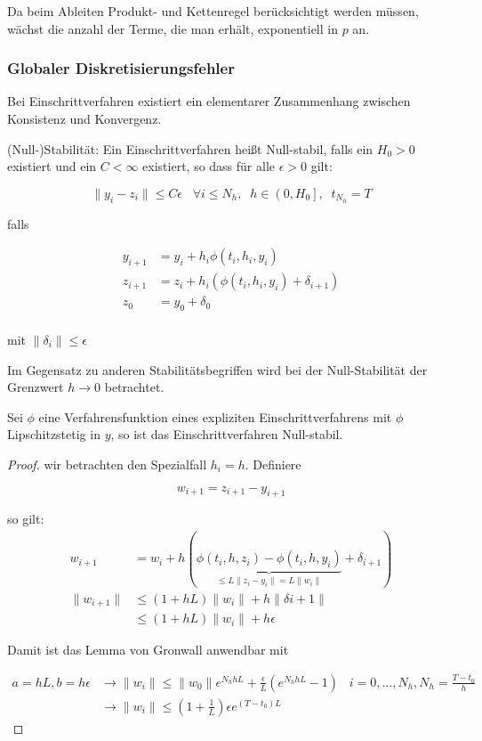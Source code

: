 Da beim Ableiten Produkt- und Kettenregel berücksichtigt werden müssen, wächst die anzahl der Terme, die man erhält, exponentiell in $p$ an.

\subsubsection{Globaler Diskretisierungsfehler}

Bei Einschrittverfahren existiert ein elementarer Zusammenhang zwischen Konsistenz und Konvergenz.

\begin{definition}[Definition IV.5] (Null-)Stabilität: Ein Einschrittverfahren heißt Null-stabil, falls ein $H_0 > 0$ existiert und ein $C < \infty$ existiert, so dass für alle $\epsilon > 0$ gilt:

	$$\|y_i - z_i\| \le C \epsilon \;\;\;\forall i \le N_h,\;\;h \in \left(0,H_0\right],\;\;t_{N_h} = T$$

	falls
	
	\begin{align*}
		y_{i+1} &= y_i + h_i \phi (t_i, h_i, y_i) \\
		z_{i+1} &= z_i + h_i (\phi (t_i, h_i, y_i) + \delta_{i+1}) \\
		z_0 &= y_0 + \delta_0 \\
	\end{align*}
	
	mit $\|\delta_i\| \le \epsilon$

\end{definition}


Im Gegensatz zu anderen Stabilitätsbegriffen wird bei der Null-Stabilität der Grenzwert $h \to 0$ betrachtet.

\begin{theorem}
	Sei $\phi$ eine Verfahrensfunktion eines expliziten Einschrittverfahrens mit $\phi$ Lipschitzstetig in $y$, so ist das Einschrittverfahren Null-stabil.
\end{theorem}

\begin{proof} wir betrachten den Spezialfall $h_i = h$. Definiere

	$$w_{i+1} = z_{i+1} - y_{i+1}$$

	so gilt:
	\begin{align*}
		w_{i+1} &= w_i + h(\underbrace{\phi(t_i, h, z_i) - \phi(t_i, h, y_i)}_{\le L \|z_i - y_i\| = L \|w_i\|} + \delta_{i+1})\\
		\|w_{i+1}\| &\le (1 + hL) \|w_i\| + h\|\delta{i+1}\| \\
		& \le (1+hL)\|w_i\| + h\epsilon
	\end{align*}
	
	Damit ist das Lemma von Gronwall anwendbar mit 
	
	\begin{align*}
		a = hL, b = h\epsilon &\rightarrow \|w_i\| \le \|w_0\| e^{N_h hL} + \frac{\epsilon}{L}\left(e^{N_h hL} - 1\right) \;\;\; i = 0, \dots, N_h, N_h = \frac{T - t_0}{h}\\
		&\rightarrow \|w_i\| \le \left(1 + \frac{1}{L}\right) \epsilon e^{(T-t_0)L}
	\end{align*}
\end{proof}

